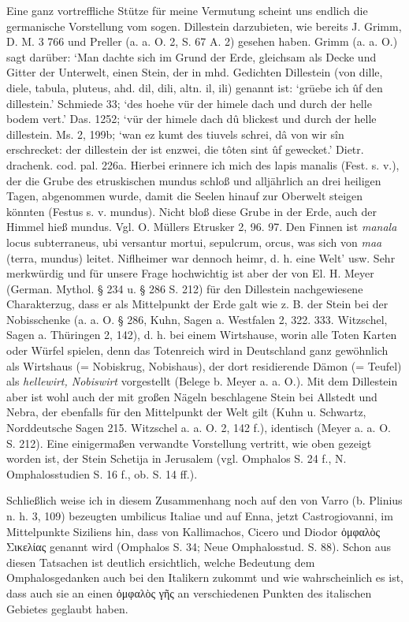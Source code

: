\documentclass[a4paper, 11pt, oneside]{article}
\begin{document}
Eine ganz vortreffliche Stütze für meine Vermutung scheint uns endlich die germanische Vorstellung vom sogen. Dillestein darzubieten, wie bereits J. Grimm, D. M. 3 766 und Preller (a. a. O. 2, S. 67 A. 2) gesehen haben. Grimm (a. a. O.) sagt darüber: `Man dachte sich im Grund der Erde, gleichsam als Decke und Gitter der Unterwelt, einen Stein, der in mhd. Gedichten Dillestein (von dille, diele, tabula, pluteus, ahd. dil, dili, altn. {\thorn}il, {\thorn}ili) genannt ist: `grüebe ich ûf den dillestein.' Schmiede 33; `des hoehe vür der himele dach und durch der helle bodem vert.' Das. 1252; `vür der himele dach dû blickest und durch der helle dillestein. Ms. 2, 199b; `wan ez kumt des tiuvels schrei, dâ von wir sîn erschrecket: der dillestein der ist enzwei, die tôten sint ûf gewecket.' Dietr. drachenk. cod. pal. 226a. Hierbei erinnere ich mich des lapis manalis (Fest. s. v.), der die Grube des etruskischen mundus schloß und alljährlich an drei heiligen Tagen, abgenommen wurde, damit die Seelen hinauf zur Oberwelt steigen könnten (Festus s. v. mundus). Nicht bloß diese Grube in der Erde, auch der Himmel hieß mundus. Vgl. O. Müllers Etrusker 2, 96. 97. Den Finnen ist \emph{manala} locus subterraneus, ubi versantur mortui, sepulcrum, orcus, was sich von \emph{maa} (terra, mundus) leitet. Niflheimer war dennoch heimr, d. h. eine Welt' usw. Sehr merkwürdig und für unsere Frage hochwichtig ist aber der von El. H. Meyer (German. Mythol. § 234 u. § 286 S. 212) für den Dillestein nachgewiesene Charakterzug, dass er als Mittelpunkt der Erde galt wie z. B. der Stein bei der Nobisschenke (a. a. O. § 286, Kuhn, Sagen a. Westfalen 2, 322. 333. Witzschel, Sagen a. Thüringen 2, 142), d. h. bei einem Wirtshause, worin alle Toten Karten oder Würfel spielen, denn das Totenreich wird in Deutschland ganz gewöhnlich als Wirtshaus (= Nobiskrug, Nobishaus), der dort residierende Dämon (= Teufel) als \emph{hellewirt, Nobiswirt} vorgestellt (Belege b. Meyer a. a. O.). Mit dem Dillestein aber ist wohl auch der mit großen Nägeln beschlagene Stein bei Allstedt und Nebra, der ebenfalls für den Mittelpunkt der Welt gilt (Kuhn u. Schwartz, Norddeutsche Sagen 215. Witzschel a. a. O. 2, 142 f.), identisch (Meyer a. a. O. S. 212). Eine einigermaßen verwandte Vorstellung vertritt, wie oben gezeigt worden ist, der Stein Schetija in Jerusalem (vgl. Omphalos S. 24 f., N. Omphalosstudien S. 16 f., ob. S. 14 ff.).

Schließlich weise ich in diesem Zusammenhang noch auf den von Varro (b. Plinius n. h. 3, 109) bezeugten umbilicus Italiae und auf Enna, jetzt Castrogiovanni, im Mittelpunkte Siziliens hin, dass von Kallimachos, Cicero und Diodor ὀμφαλὸς Σικελίας genannt wird (Omphalos S. 34; Neue Omphalosstud. S. 88). Schon aus diesen Tatsachen ist deutlich ersichtlich, welche Bedeutung dem Omphalosgedanken auch bei den Italikern zukommt und wie wahrscheinlich es ist, dass auch sie an einen ὀμφαλὸς γῆς an verschiedenen Punkten des italischen Gebietes geglaubt haben.
\clearpage
\end{document}
